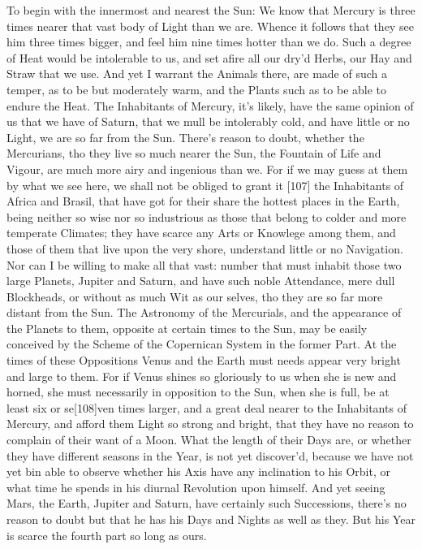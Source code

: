 \documentclass[letterpaper]{book}
\begin{document}
To begin with the innermost and nearest the Sun: We know that Mercury is
three times nearer that vast body of Light than we are. Whence it follows
that they see him three times bigger, and feel him nine times hotter than we
do. Such a degree of Heat would be intolerable to us, and set afire all our
dry'd Herbs, our Hay and Straw that we use. And yet I warrant the Animals
there, are made of such a temper, as to be but moderately warm, and the
Plants such as to be able to endure the Heat. The Inhabitants of Mercury,
it's likely, have the same opinion of us that we have of Saturn, that we
mull be intolerably cold, and have little or no Light, we are so far from
the Sun. There's reason to doubt, whether the Mercurians, tho they live so
much nearer the Sun, the Fountain of Life and Vigour, are much more airy and
ingenious than we. For if we may guess at them by what we see here, we shall
not be obliged to grant it [107] the Inhabitants of Africa and Brasil, that
have got for their share the hottest places in the Earth, being neither so
wise nor so industrious as those that belong to colder and more temperate
Climates; they have scarce any Arts or Knowlege among them, and those of
them that live upon the very shore, understand little or no Navigation.  Nor
can I be willing to make all that vast: number that must inhabit those two
large Planets, Jupiter and Saturn, and have such noble Attendance, mere dull
Blockheads, or without as much Wit as our selves, tho they are so far more
distant from the Sun. The Astronomy of the Mercurials, and the appearance of
the Planets to them, opposite at certain times to the Sun, may be easily
conceived by the Scheme of the Copernican System in the former Part. At the
times of these Oppositions Venus and the Earth must needs appear very bright
and large to them. For if Venus shines so gloriously to us when she is new
and horned, she must necessarily in opposition to the Sun, when she is full,
be at least six or se[108]ven times larger, and a great deal nearer to the
Inhabitants of Mercury, and afford them Light so strong and bright, that
they have no reason to complain of their want of a Moon.  What the length of
their Days are, or whether they have different seasons in the Year, is not
yet discover'd, because we have not yet bin able to observe whether his Axis
have any inclination to his Orbit, or what time he spends in his diurnal
Revolution upon himself. And yet seeing Mars, the Earth, Jupiter and Saturn,
have certainly such Successions, there's no reason to doubt but that he has
his Days and Nights as well as they. But his Year is scarce the fourth part
so long as ours.
\end{document}
